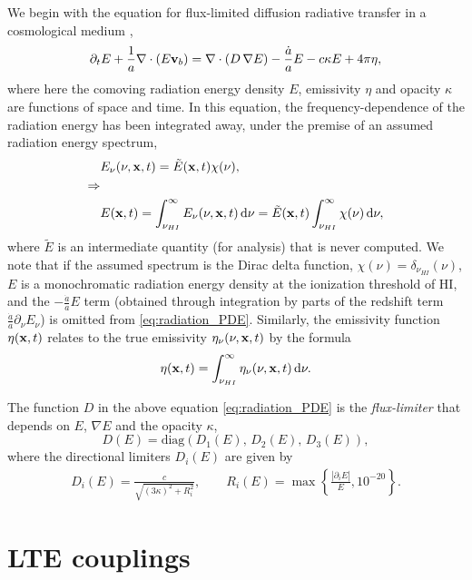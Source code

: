 \documentclass[letterpaper,10pt]{article}
\renewcommand{\(}{\left(}
\renewcommand{\)}{\right)}
\newcommand{\vb}{{\bf v}_b}
\newcommand{\xvec}{{\bf x}}
\begin{document}
We begin with the equation for flux-limited diffusion radiative
transfer in a cosmological medium \cite{ReynoldsHayesPaschosNorman2009},
\begin{equation}
\label{eq:radiation_PDE}
  \partial_{t} E + \frac1a \nabla\cdot\(E\vb\) =
    \nabla\cdot\(D\,\nabla E\) - \frac{\dot{a}}{a} E - c\kappa E + 4\pi\eta,
\end{equation}
where here the comoving radiation energy density $E$, emissivity
$\eta$ and opacity $\kappa$ are functions of space and time.  In this
equation, the frequency-dependence of the radiation energy has been
integrated away, under the premise of an assumed radiation energy
spectrum, 
\begin{align}
  \notag
  & E_{\nu}(\nu,\xvec,t) = \tilde{E}(\xvec,t) \chi(\nu), \\
  \notag
  \Rightarrow & \\
  \label{eq:spectrum}
  & E(\xvec,t) = \int_{\nu_{HI}}^{\infty} E_{\nu}(\nu,\xvec,t)\,\mathrm{d}\nu 
    = \tilde{E}(\xvec,t) \int_{\nu_{HI}}^{\infty} \chi(\nu)\,\mathrm{d}\nu,
\end{align}
where $\tilde{E}$ is an intermediate quantity (for analysis) that is
never computed.  We note that if the assumed spectrum is the Dirac
delta function, $\chi(\nu) = \delta_{\nu_{HI}}(\nu)$, $E$ is a
monochromatic radiation energy density at the ionization threshold of
HI, and the $-\frac{\dot{a}}{a}E$ term (obtained through integration
by parts of the redshift term
$\frac{\dot{a}}{a}\partial_{\nu}E_{\nu}$) is omitted from
\eqref{eq:radiation_PDE}. Similarly, the emissivity function
$\eta(\xvec,t)$ relates to the true emissivity 
$\eta_{\nu}(\nu,\xvec,t)$ by the formula
\begin{equation}
\label{eq:emissivity}
  \eta(\xvec,t) = \int_{\nu_{HI}}^{\infty}\eta_{\nu}(\nu,\xvec,t)\,\mathrm{d}\nu.
\end{equation}

The function $D$ in the above equation \eqref{eq:radiation_PDE} is
the {\em flux-limiter} that depends on $E$, $\nabla E$ and the 
opacity $\kappa$,  
\[
   D(E) = \text{diag}\( D_1(E),\, D_2(E),\, D_3(E) \),
\]
where the directional limiters $D_i(E)$ are given by \cite{Morel2000}
\begin{align}
  \label{eq:Larsen_limiter}
   D_i(E) = \frac{c}{\sqrt{(3\kappa)^2 + R_i^2}}, \qquad
   R_i(E) = \max\left\{\frac{|\partial_i E|}{E}, 10^{-20} \right\}.
\end{align}




\section{LTE couplings}
\label{sec:lte_model}
\end{document}
